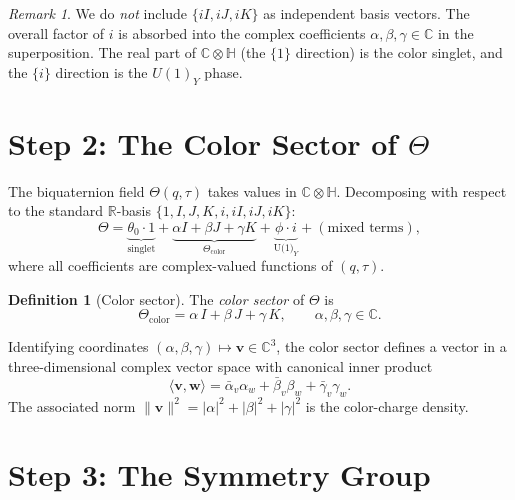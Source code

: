\documentclass[12pt,a4paper]{article}
\theoremstyle{definition}
\newtheorem{definition}[theorem]{Definition}
\theoremstyle{remark}
\newtheorem{remark}[theorem]{Remark}
\begin{document}
\begin{remark}
We do \emph{not} include $\{iI, iJ, iK\}$ as independent basis vectors.
The overall factor of $i$ is absorbed into the complex coefficients
$\alpha, \beta, \gamma \in \mathbb{C}$ in the superposition.  The real part
of $\mathbb{C}\otimes\mathbb{H}$ (the $\{1\}$ direction) is the color singlet,
and the $\{i\}$ direction is the $U(1)_Y$ phase.
\end{remark}

\section{Step 2: The Color Sector of $\Theta$}
\label{sec:color_sector}

The biquaternion field $\Theta(q,\tau)$ takes values in
$\mathbb{C}\otimes\mathbb{H}$.  Decomposing with respect to the standard
$\mathbb{R}$-basis $\{1, I, J, K, i, iI, iJ, iK\}$:
\[
  \Theta = \underbrace{\theta_0 \cdot 1}_{\text{singlet}}
         + \underbrace{\alpha I + \beta J + \gamma K}_{\Theta_{\mathrm{color}}}
         + \underbrace{\phi \cdot i}_{\text{U(1)}_Y}
         + (\text{mixed terms}),
\]
where all coefficients are complex-valued functions of $(q, \tau)$.

\begin{definition}[Color sector]
\label{def:color_sector}
The \emph{color sector} of $\Theta$ is
\[
  \Theta_{\mathrm{color}} = \alpha\, I + \beta\, J + \gamma\, K,
  \qquad \alpha, \beta, \gamma \in \mathbb{C}.
\]
\end{definition}

Identifying coordinates $(\alpha, \beta, \gamma) \mapsto
\mathbf{v} \in \mathbb{C}^3$, the color sector defines a vector in a
three-dimensional complex vector space with canonical inner product
\[
  \langle \mathbf{v}, \mathbf{w} \rangle
  = \bar{\alpha}_v \alpha_w + \bar{\beta}_v \beta_w + \bar{\gamma}_v \gamma_w.
\]
The associated norm $\|\mathbf{v}\|^2 = |\alpha|^2 + |\beta|^2 + |\gamma|^2$
is the color-charge density.

\section{Step 3: The Symmetry Group}
\label{sec:symmetry}
\end{document}
